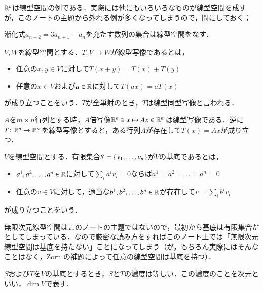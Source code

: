 $\mathbb{R}^n$は線型空間の例である．実際には他にもいろいろなものが線型空間を成すが，このノートの主題から外れる例が多くなってしまうので，問にしておく；

\begin{que}
漸化式$a_{n+2} = 3a_{n+1} - a_n$を充たす数列の集合は線型空間をなす．
\end{que}

\begin{defi}
$V,W$を線型空間とする．$T \colon V \to W$が線型写像であるとは，
\begin{itemize}
\item 任意の$x,y \in V$に対して$T(x + y)=T(x) + T(y)$
\item 任意の$x \in V$および$a \in \mathbb{R}$に対して$T(ax) = aT(x)$
\end{itemize}
が成り立つことをいう．$T$が全単射のとき，$T$は線型同型写像と言われる．
\end{defi}

\begin{que}\label{線型写像と行列の対応}
$A$を$m \times n$行列とする時，$A$倍写像$\mathbb{R}^n \ni x \mapsto Ax \in \mathbb{R}^m$は線型写像である．逆に$T \colon \mathbb{R}^n \to \mathbb{R}^m$を線型写像とすると，ある行列$A$が存在して$T(x) = Ax$が成り立つ．
\end{que}

\begin{defi}
$V$を線型空間とする．有限集合$S = \set{v_1, \dots, v_n}$が$V$の基底であるとは，
\begin{itemize}
\item $a^1, a^2, \dots, a^n \in \mathbb{R}$に対して$\sum_i a^i v_i = 0$ならば$a^1 = a^2 = \dots = a^n = 0$
\item 任意の$v \in V$に対して，適当な$b^1, b^2, \dots, b^n \in \mathbb{R}$が存在して$v = \sum_i b^i v_i$
\end{itemize}
が成り立つことをいう．
\end{defi}

\begin{dig}
無限次元線型空間はこのノートの主題ではないので，最初から基底は有限集合だとしてしまっている．なので厳密な読み方をすればこのノート上では「無限次元線型空間は基底を持たない」ことになってしまう（が，もちろん実際にはそんなことはなく，Zorn の補題によって任意の線型空間は基底を持つ）．
\end{dig}

\begin{que}
$S$および$T$を$V$の基底とするとき，$S$と$T$の濃度は等しい．この濃度のことを次元といい，$\dim V$で表す．
\end{que}

